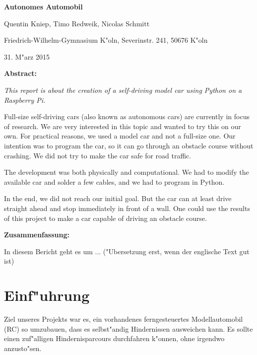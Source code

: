 \documentclass[a4paper,12pt]{article}
\begin{document}
{\Large\bf Autonomes Automobil}

\medskip

Quentin Kniep, Timo Redweik, Nicolas Schmitt

\medskip

Friedrich-Wilhelm-Gymnasium K"oln, Severinstr. 241, 50676 K"oln

\medskip

31. M"arz  2015

\medskip

{\bf  Abstract:}

{\small

	{\it This report is about the creation of a self-driving model car using Python on a Raspberry Pi.}
	
	Full-size self-driving cars (also known as autonomous cars) are currently in focus of research.
	We are very interested in this topic and wanted to try this on our own.
	For practical reasons, we used a model car and not a full-size one.
	Our intention was to program the car, so it can go through an obstacle course without crashing.
	We did not try to make the car safe for road traffic.

	The development was both physically and computational.
	We had to modify the available car and solder a few cables, and we had to program in Python.
	
	In the end, we did not reach our initial goal.
	But the car can at least drive straight ahead and stop immediately in front of a wall.
	One could use the results of this project to make a car capable of driving an obstacle 	course.

}

\medskip

{\bf  Zusammenfassung:}

{\small

	In diesem Bericht geht es um ... ("Ubersetzung erst, wenn der englische Text gut ist)

}

\bigskip


\tableofcontents

\newpage


\section{Einf"uhrung}\label{sec1}

Ziel unseres Projekts war es, ein vorhandenes ferngesteuertes Modellautomobil (RC) so umzubauen, dass es selbst"andig Hindernissen ausweichen kann.
Es sollte einen zuf"alligen Hindernisparcours durchfahren k"onnen, ohne irgendwo anzusto"sen.
\end{document}
